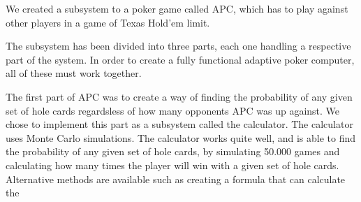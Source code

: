 We created a subsystem to a poker game called APC, which has to play against other players in a game of Texas Hold'em limit.

The subsystem has been divided into three parts, each one handling a respective part of the system. In order to create a fully functional adaptive poker computer, all of these must work together.

The first part of APC was to create a way of finding the probability of any given set of hole cards regardsless of how many opponents APC was up against.
We chose to implement this part as a subsystem called the calculator. The calculator uses Monte Carlo simulations. The calculator works quite well, and is able to find the probability of any given set of hole cards, by simulating 50.000 games and calculating how many times the player will win with a given set of hole cards. 
Alternative methods are available such as creating a formula that can calculate the 